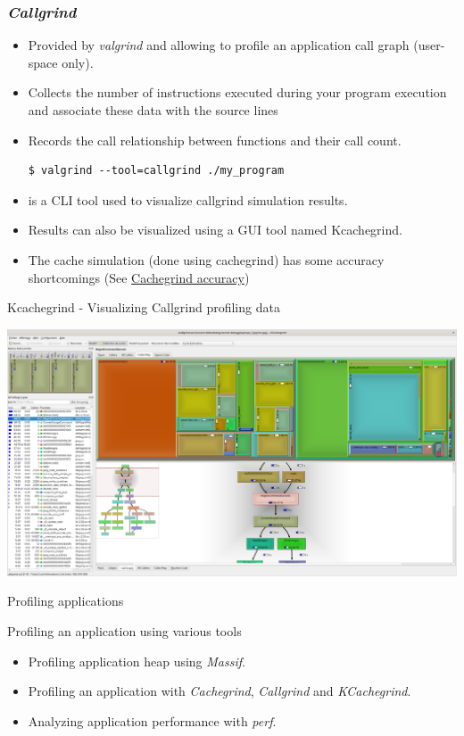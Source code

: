 \begin{frame}[fragile]
  \frametitle{{\em Callgrind}}
  \begin{itemize}
    \item Provided by {\em valgrind} and allowing to profile an application call graph
          (user-space only).
    \item Collects the number of instructions executed during your program
          execution and associate these data with the source lines
    \item Records the call relationship between functions and their call
          count.
  \begin{block}{}
    \begin{verbatim}
$ valgrind --tool=callgrind ./my_program
    \end{verbatim}
  \end{block}

  \item {} is a CLI tool used to visualize callgrind
        simulation results.
  \item Results can also be visualized using a GUI tool named Kcachegrind.
  \item The cache simulation (done using cachegrind) has some accuracy
        shortcomings (See \href{https://valgrind.org/docs/manual/cg-manual.html#cg-manual.annopts.accuracy}{Cachegrind accuracy})
  \end{itemize}
\end{frame}

\begin{frame}{Kcachegrind - Visualizing Callgrind profiling data}
  \begin{center}
    \includegraphics[height=0.8\textheight]{slides/debugging-application-profiling/kcachegrind_callgrind.png}
  \end{center}
\end{frame}

\setuplabframe
{Profiling applications}
{
  Profiling an application using various tools
  \begin{itemize}
    \item Profiling application heap using {\em Massif}.
    \item Profiling an application with {\em Cachegrind}, {\em Callgrind} and
          {\em KCachegrind}.
    \item Analyzing application performance with {\em perf}.
  \end{itemize}
}
